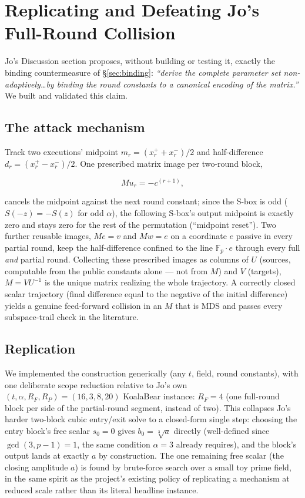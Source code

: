 \documentclass[11pt]{article}
\newcommand{\Fp}{\mathbb{F}_p}
\begin{document}
\section{Replicating and Defeating Jo's Full-Round Collision}
\label{sec:midpoint-reset}

Jo's Discussion section proposes, without building or testing it, exactly
the binding countermeasure of \S\ref{sec:binding}: \emph{``derive the
complete parameter set non-adaptively\dots by binding the round constants
to a canonical encoding of the matrix.''} We built and validated this
claim.

\subsection{The attack mechanism}

Track two executions' midpoint $m_r = (x^+_r+x^-_r)/2$ and half-difference
$d_r=(x^+_r-x^-_r)/2$. One prescribed matrix image per two-round block,

\[
  M u_r = -c^{(r+1)},
\]

cancels the midpoint against the next round constant; since the S-box is
odd ($S(-z)=-S(z)$ for odd $\alpha$), the following S-box's output
midpoint is exactly zero and stays zero for the rest of the permutation
(``midpoint reset''). Two further reusable images, $Me=v$ and $Mw=e$ on a
coordinate $e$ passive in every partial round, keep the half-difference
confined to the line $\Fp\cdot e$ through every full \emph{and} partial
round. Collecting these prescribed images as columns of $U$ (sources,
computable from the public constants alone --- not from $M$) and $V$
(targets), $M = VU^{-1}$ is the unique matrix realizing the whole
trajectory. A correctly closed scalar trajectory (final difference equal
to the negative of the initial difference) yields a genuine feed-forward
collision in an $M$ that is MDS and passes every subspace-trail check in
the literature.

\subsection{Replication}

We implemented the construction generically (any $t$, field, round
constants), with one deliberate scope reduction relative to Jo's own
$(t,\alpha,R_F,R_P)=(16,3,8,20)$ KoalaBear instance: $R_F=4$ (one
full-round block per side of the partial-round segment, instead of two).
This collapses Jo's harder two-block cubic entry/exit solve to a
closed-form single step: choosing the entry block's free scalar $s_0=0$
gives $b_0 = \sqrt[3]{a}$ directly (well-defined since $\gcd(3,p-1)=1$,
the same condition $\alpha=3$ already requires), and the block's output
lands at exactly $a$ by construction. The one remaining free scalar (the
closing amplitude $a$) is found by brute-force search over a small toy
prime field, in the same spirit as the project's existing policy of
replicating a mechanism at reduced scale rather than its literal headline
instance.
\end{document}
